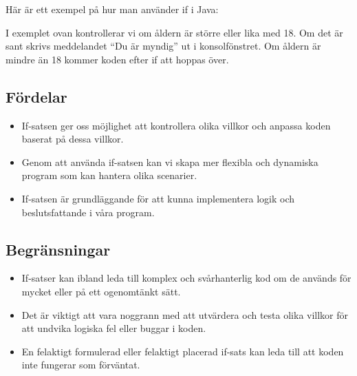 Här är ett exempel på hur man använder if i Java:

\hypertarget{cb1}{}
\begin{Shaded}
\begin{Highlighting}[]
\OperatorTok{=} \OperatorTok{;}
 \OperatorTok{(}\OperatorTok{\textgreater{}=} \OperatorTok{)} \OperatorTok{\{}
    \OperatorTok{(}\OperatorTok{);}
\OperatorTok{\}}
\end{Highlighting}
\end{Shaded}

I exemplet ovan kontrollerar vi om åldern är större eller lika med 18.
Om det är sant skrivs meddelandet ``Du är myndig'' ut i konsolfönstret.
Om åldern är mindre än 18 kommer koden efter if att hoppas över.

\hypertarget{fuxf6rdelar}{%
\subsection{Fördelar}\label{fuxf6rdelar}}

\begin{itemize}
\tightlist
\item
  If-satsen ger oss möjlighet att kontrollera olika villkor och anpassa
  koden baserat på dessa villkor.
\item
  Genom att använda if-satsen kan vi skapa mer flexibla och dynamiska
  program som kan hantera olika scenarier.
\item
  If-satsen är grundläggande för att kunna implementera logik och
  beslutsfattande i våra program.
\end{itemize}

\hypertarget{begruxe4nsningar}{%
\subsection{Begränsningar}\label{begruxe4nsningar}}

\begin{itemize}
\tightlist
\item
  If-satser kan ibland leda till komplex och svårhanterlig kod om de
  används för mycket eller på ett ogenomtänkt sätt.
\item
  Det är viktigt att vara noggrann med att utvärdera och testa olika
  villkor för att undvika logiska fel eller buggar i koden.
\item
  En felaktigt formulerad eller felaktigt placerad if-sats kan leda till
  att koden inte fungerar som förväntat.
\end{itemize}

